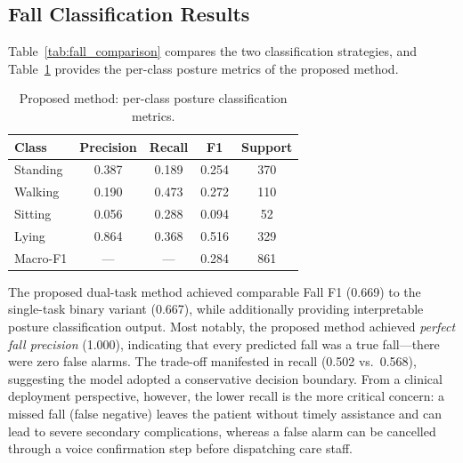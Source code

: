 \subsection{Fall Classification Results}
\label{sec:fall_results}

Table~\ref{tab:fall_comparison} compares the two classification strategies, and Table~\ref{tab:posture_detail} provides the per-class posture metrics of the proposed method.

\begin{table}[t]
\centering
\caption{Comparison of fall classification strategies (Stage 2, frozen SimDR backbone).}
\label{tab:fall_comparison}
\end{table}

\begin{table}[t]
\centering
\caption{Proposed method: per-class posture classification metrics.}
\label{tab:posture_detail}
\begin{tabular}{|l|c|c|c|c|}
\hline
Class & Precision & Recall & F1 & Support \\
\hline
Standing & 0.387 & 0.189 & 0.254 & 370 \\
Walking  & 0.190 & 0.473 & 0.272 & 110 \\
Sitting  & 0.056 & 0.288 & 0.094 & 52 \\
Lying    & 0.864 & 0.368 & 0.516 & 329 \\
\hline
Macro-F1 & --- & --- & 0.284 & 861 \\
\hline
\end{tabular}
\end{table}

The proposed dual-task method achieved comparable Fall F1 (0.669) to the single-task binary variant (0.667), while additionally providing interpretable posture classification output. Most notably, the proposed method achieved \emph{perfect fall precision} (1.000), indicating that every predicted fall was a true fall---there were zero false alarms. The trade-off manifested in recall (0.502 vs.\ 0.568), suggesting the model adopted a conservative decision boundary. From a clinical deployment perspective, however, the lower recall is the more critical concern: a missed fall (false negative) leaves the patient without timely assistance and can lead to severe secondary complications, whereas a false alarm can be cancelled through a voice confirmation step before dispatching care staff.

